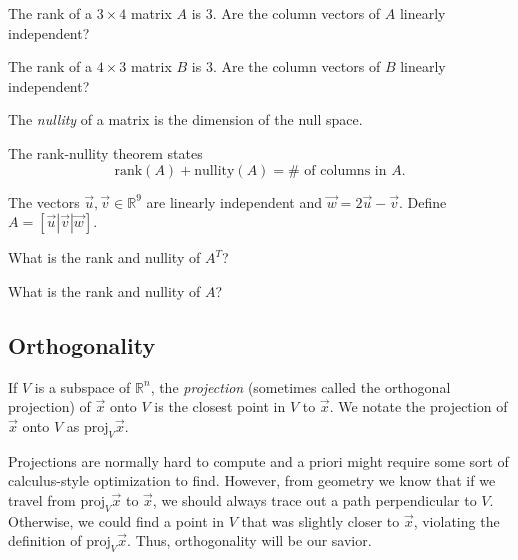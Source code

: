 \documentclass[14pt]{problemset}
\newcommand{\R}{\mathbb{R}}
\newcommand{\proj}{\mathrm{proj}}
\newcommand{\rank}{\mathrm{rank}}
\newcommand{\nnul}{\mathrm{nullity}}
\begin{document}
	\question
	\begin{parts}
		\item The rank of a $3\times 4$ matrix $A$ is $3$.  Are the column vectors of $A$ linearly independent?
		\item The rank of a $4\times 3$ matrix $B$ is $3$.  Are the column vectors of $B$ linearly independent?
	\end{parts}




	\begin{theorem}
	The \emph{nullity} of a matrix is the dimension of the null space.

	The rank-nullity theorem states
	\[
		\rank(A)+\nnul(A) = \#\text{ of columns in }A.
	\]
	\end{theorem}

	\question
	The vectors $\vec u,\vec v\in\R^9$ are linearly independent and $\vec w=2\vec u-\vec v$.
	Define $A=[\vec u|\vec v|\vec w]$.
	\begin{parts}
		\item What is the rank and nullity of $A^T$?
		\item What is the rank and nullity of $A$?
	\end{parts}

\subsection*{Orthogonality}

	\begin{definition}
		If $V$ is a subspace of $\R^n$, the \emph{projection}
		(sometimes called the orthogonal projection) of $\vec x$ onto $V$
		is the closest point in $V$ to $\vec x$. We notate the projection
		of $\vec x$ onto $V$ as $\proj_V\vec x$.
	\end{definition}

	Projections are normally hard to compute and a priori might require some sort
	of calculus-style optimization to find.  However, from geometry we know that 
	if we travel from $\proj_V \vec x$ to $\vec x$, we should always trace out a path
	perpendicular to $V$.  Otherwise, we could find a point in $V$ that was slightly closer
	to $\vec x$, violating the definition of $\proj_V \vec x$.  Thus, orthogonality
	will be our savior.
\end{document}
